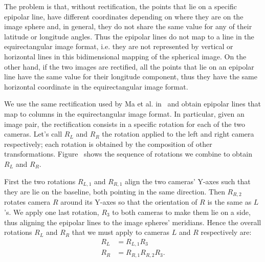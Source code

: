 The problem is that, without rectification, the points that lie on a specific
epipolar line, have different coordinates depending on where they are on the
image sphere and, in general, they do not share the same value for any of their 
latitude or longitude angles. Thus the epipolar lines do not map to a line in
the equirectangular image format, i.e. they are not represented by vertical or 
horizontal lines in this bidimensional mapping of the spherical image.
On the other hand, if the two images are rectified, all the points that lie
on an epipolar line have the same value for their longitude component, thus
they have the same horizontal coordinate in the equirectangular image format.

We use the same rectification used by Ma et al. in~\cite{ma20153d} and obtain
epipolar lines that map to columns in the equirectangular image format.
In particular, given an image pair, the rectification consists in a specific
rotation for each of the two cameras. Let's call $R_L$ and $R_R$ the rotation
applied to the left and right camera respectively; each rotation is obtained
by the composition of other transformations. Figure~ shows
the sequence of rotations we combine to obtain $R_L$ and $R_R$.


First the two rotations $R_{L, 1}$ and $R_{R, 1}$ align the two cameras' Y-axes
such that they are lie on the baseline, both pointing in the same
direction. Then $R_{R, 2}$ rotates camera $R$ around its Y-axes so that
the orientation of $R$
is the same as $L$'s. We apply one last rotation, $R_3$ to both
cameras to make them lie on a side, thus aligning the epipolar lines to the
image spheres' meridians.
Hence the overall rotations $R_L$ and $R_R$ that we must apply to cameras $L$ and $R$
respectively are:
\begin{align}
	R_L &= R_{L, 1}R_3 \\
	R_R &= R_{R, 1}R_{R, 2}R_3	\text{.}
\end{align}

